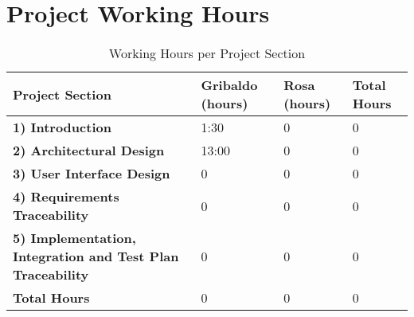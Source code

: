 \section*{Project Working Hours}

\begin{table}[ht!]
\centering
\begin{tabular}{|p{6cm}|p{2.5cm}|p{2.5cm}|p{2.5cm}|}
\hline
\textbf{Project Section} & \textbf{Gribaldo (hours)} & \textbf{Rosa (hours)} & \textbf{Total Hours} \\
\hline
\textbf{ 1) Introduction}                   & 1:30   & 0   & 0   \\
\textbf{ 2) Architectural Design}            & 13:00    & 0  & 0   \\
\textbf{ 3) User Interface Design}          & 0     & 0   & 0   \\
\textbf{ 4) Requirements Traceability}    & 0     & 0      & 0   \\
\textbf{ 5) Implementation, Integration and Test Plan Traceability}    & 0     & 0      & 0   \\
\hline
\textbf{Total Hours}                        & 0     & 0     & 0   \\
\hline
\end{tabular}
\caption{Working Hours per Project Section}
\label{tab:working_hours}
\end{table}

\vspace*{\fill}
